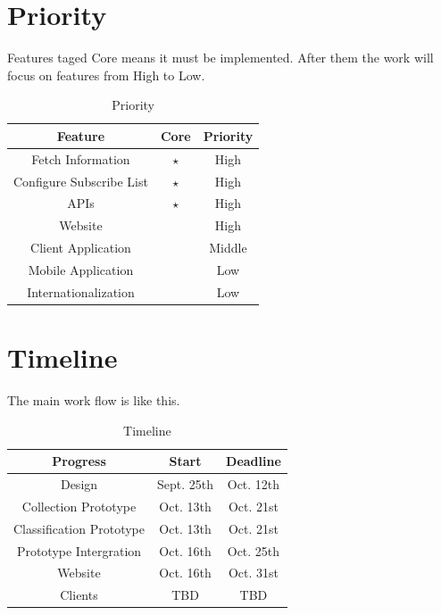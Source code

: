 \section{Priority}
  Features taged Core means it must be implemented. After them the work will focus on features from High to Low.
  \begin{center}
  \begin{table}[h]
    \begin{center}
    \begin{tabular}{c|c|c}
      Feature & Core & Priority \\ \hline
      Fetch Information & $\star$ & High \\
      Configure Subscribe List & $\star$ & High \\
      APIs & $\star$ & High \\
      Website &  & High \\
      Client Application &   & Middle \\
      Mobile Application &   & Low \\
      Internationalization &   & Low \\
    \end{tabular}
    \end{center}
    \caption{Priority}
  \end{table}
  \end{center}

\section{Timeline}
  The main work flow is like this.
  \begin{center}
  \begin{table}[h]
    \begin{center}
    \begin{tabular}{c|c|c}
      Progress & Start & Deadline \\ \hline
      Design & Sept. 25th & Oct. 12th \\
      Collection Prototype & Oct. 13th & Oct. 21st \\
      Classification Prototype & Oct. 13th & Oct. 21st \\
      Prototype Intergration & Oct. 16th & Oct. 25th \\
      Website & Oct. 16th & Oct. 31st \\
      Clients & TBD & TBD
    \end{tabular}
    \end{center}
    \caption{Timeline}
  \end{table}
  \end{center}

